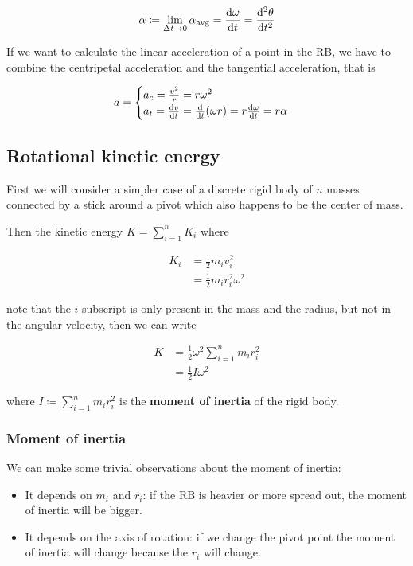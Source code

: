 \documentclass[14pt]{extarticle}
\begin{document}
\begin{equation}
    \alpha \coloneq \lim_{\Delta t \to 0} \alpha_{\text{avg}} = \dv{\omega}{t} = \dv[2]{\theta}{t}
\end{equation}

If we want to calculate the linear acceleration of a point in the RB, we have to combine the centripetal acceleration and the tangential acceleration, that is

$$
    a = \begin{cases}
        a_c = \frac{v^2}{r} = r\omega^2 \\
        a_t = \dv{v}{t} = \dv{t}(\omega r) = r \dv{\omega}{t} = r\alpha
    \end{cases}
$$

\subsection{Rotational kinetic energy}

First we will consider a simpler case of a discrete rigid body of $n$ masses connected by a stick around a pivot which also happens to be the center of mass.

Then the kinetic energy $K = \sum_{i=1}^n K_i$ where

\begin{align}
    K_i & = \frac{1}{2}m_i v_i^2          \\
        & = \frac{1}{2}m_i r_i^2 \omega^2
\end{align}

note that the $i$ subscript is only present in the mass and the radius, but not in the angular velocity, then we can write

\begin{align}
    K & = \frac{1}{2} \omega^2 \sum_{i=1}^n m_i r_i^2 \\
      & = \frac{1}{2} I \omega^2
\end{align}

where $I \coloneq \sum_{i=1}^n m_i r_i^2$ is the \textbf{moment of inertia} of the rigid body.

\subsubsection{Moment of inertia}

We can make some trivial observations about the moment of inertia:

\begin{itemize}
    \item It depends on $m_i$ and $r_i$: if the RB is heavier or more spread out, the moment of inertia will be bigger.
    \item It depends on the axis of rotation: if we change the pivot point the moment of inertia will change because the $r_i$ will change.
\end{itemize}
\end{document}
